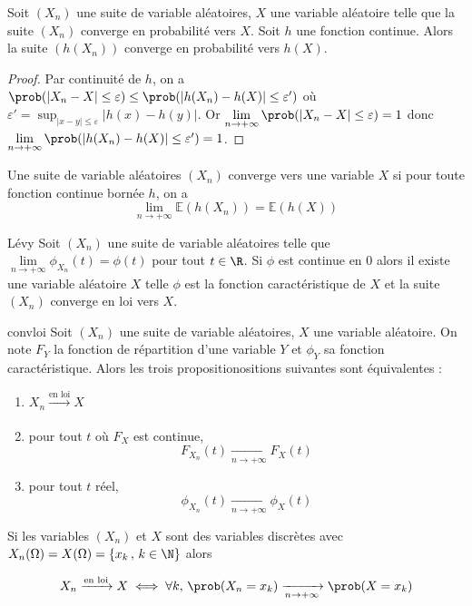 \begin{proposition}{}{}
	Soit $(X_n)$ une suite de variable aléatoires, $X$ une variable aléatoire telle que la suite $(X_n)$ converge en probabilité vers $X$. Soit $h$ une fonction continue. Alors la suite $(h(X_n))$ converge en probabilité vers $h(X)$.
\end{proposition}
\begin{proof}
	Par continuité de $h$, on a $\prob(|X_n-X| \leq \varepsilon) \leq \prob(|h(X_n)-h(X)| \leq \varepsilon')$ où $\varepsilon' = \sup_{|x-y| \leq \varepsilon} |h(x)-h(y)|$. Or $\lim\limits_{n \to +\infty} \prob(|X_n-X| \leq \varepsilon) = 1$ donc $\lim\limits_{n \to +\infty} \prob(|h(X_n)-h(X)| \leq \varepsilon') = 1$.
\end{proof}

\begin{definition}{}{}
	Une suite de variable aléatoires $(X_n)$ converge  vers une variable $X$ si pour toute fonction continue bornée $h$, on a 
	$$\lim_{n \to +\infty} \mathbb{E}(h(X_n)) = \mathbb{E}(h(X)) $$
\end{definition}

\begin{theoreme}{Lévy}{}
	Soit $(X_n)$ une suite de variable aléatoires telle que $\lim\limits_{n \to +\infty} \phi_{X_n}(t) = \phi(t)$ pour tout $t \in \R$. Si $\phi$ est continue en $0$ alors il existe une variable aléatoire $X$ telle $\phi$ est la fonction caractéristique de $X$ et la suite $(X_n)$ converge en loi vers $X$.
\end{theoreme}
	
\begin{proposition}{}{convloi}
		Soit $(X_n)$ une suite de variable aléatoires, $X$ une variable aléatoire. On note $F_Y$ la fonction de répartition d'une variable $Y$ et $\phi_Y$ sa fonction caractéristique. Alors les trois propositionositions suivantes sont équivalentes :
		\begin{enumerate}
			\item $X_n \xrightarrow[]{\text{en loi}}X$
			\item pour tout $t$ où $F_X$ est continue, 		$$F_{X_n}(t) \xrightarrow[n\to+\infty]{} F_X(t)$$
			\item pour tout $t$ réel, 		$$\phi_{X_n}(t) \xrightarrow[n\to+\infty]{} \phi_X(t)$$
		\end{enumerate}
	
		Si  les variables $(X_n)$ et $X$ sont des variables discrètes avec $X_n(\Omega) = X(\Omega) = \{x_k \, , \, k \in \N\} $ alors 
	
	$$ X_n \xrightarrow[]{\text{en loi}}X \iff \forall k, \, \prob(X_n=x_k) \xrightarrow[n\to+\infty]{} \prob(X=x_k)$$
\end{proposition}

